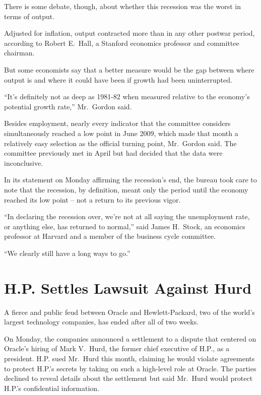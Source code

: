 ﻿\documentclass[12pt]{article}
\begin{document}
There is some debate, though, about whether this recession was the worst in terms of output.

Adjusted for inflation, output contracted more than in any other postwar period, according to Robert
E.~Hall, a Stanford economics professor and committee chairman.

But some economists say that a better measure would be the gap between where output is and where it
could have been if growth had been uninterrupted.

``It's definitely not as deep as 1981-82 when measured relative to the economy's potential growth
rate,'' Mr.~Gordon said.

Besides employment, nearly every indicator that the committee considers simultaneously reached a low
point in June 2009, which made that month a relatively easy selection as the official turning point,
Mr.~Gordon said. The committee previously met in April but had decided that the data were
inconclusive.

In its statement on Monday affirming the recession's end, the bureau took care to note that the
recession, by definition, meant only the period until the economy reached its low point -- not a
return to its previous vigor.

``In declaring the recession over, we're not at all saying the unemployment rate, or anything else,
has returned to normal,'' said James H.~Stock, an economics professor at Harvard and a member of the
business cycle committee.

``We clearly still have a long ways to go.''

\pagebreak
\section{H.P. Settles Lawsuit Against Hurd}

\lettrine{A}{} fierce and public feud between Oracle and Hewlett-Packard,
two of the world's largest technology companies, has ended after all of two weeks.

On Monday, the companies announced a settlement to a dispute that centered on Oracle's hiring of
Mark V.~Hurd, the former chief executive of H.P., as a president. H.P. sued Mr.~Hurd this month,
claiming he would violate agreements to protect H.P.'s secrets by taking on such a high-level role
at Oracle. The parties declined to reveal details about the settlement but said Mr.~Hurd would
protect H.P.'s confidential information.
\end{document}
